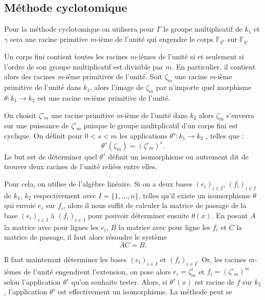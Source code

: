 \documentclass[a4paper]{article} %
\numberwithin{section}{part}
\numberwithin{equation}{section}
\newcommand\nroot[1]{\textit{#1}-ième}
\newcommand\GF[1]{\mathbb{F}_{#1}}
\begin{document}
\subsection{Méthode cyclotomique}
Pour la méthode cyclotomique on utilisera pour $\Gamma$ le groupe multiplicatif 
de $k_1$ et $\gamma$ sera une racine primitive \nroot{m} de l'unité qui engendre
le corps $\GF{q^n}$ sur $\GF{q}$.\par
Un corps fini contient toutes les racines $m$-ièmes de l'unité si et seulement 
si l'ordre de son groupe multiplicatif est divisible par $m$. En particulier, il
contient alors des racines \nroot{m} primitives de l'unité. Soit $\zeta_m$ une
racine \nroot{m} primitive de l'unité dans $k_1$, alors l'image de $\zeta_m$ par
n'importe quel morphisme $\theta : k_1 \to k_2$ est une racine \nroot{m} 
primitive de l'unité.\par
On choisit $\zeta'_m$ une racine primitive \nroot{m} de l'unité dans $k_2$
alors $\zeta_m$ s'enverra sur une puissance de $\zeta'_m$ puisque le groupe 
mulitplicatif d'un corps fini est cyclique. On définit pour $0 < s < m$ les
applications $\theta^s : k_1 \to k_2$ , telles que :
\begin{equation}
\theta^s(\zeta_m) = (\zeta'_m)^s.
\end{equation}
Le but est de déterminer quel $\theta^s$ définit un isomorphisme ou autrement
dit de trouver deux racines de l'unité reliées entre elles.\par
Pour cela, on utilise de l'algèbre linéaire. Si on a deux bases 
$(e_i)_{i\in I}$, $(f_i)_{i\in I}$ de $k_1$, $k_2$ respectivement avec $I =
\lbrace{1,\dots,n}\rbrace$, telles qu'il existe un isomorphisme $\theta$ qui 
envoie $e_i$ sur $f_i$, alors il nous suffit de calculer la matrice de passage 
de la base $(e_i)_{i\in I}$ à $(f_i)_{i\in I}$ pour pouvoir déterminer ensuite 
$\theta(x)$. En posant $A$ la matrice avec pour lignes les $e_i$, $B$ la matrice
avec pour ligne les $f_i$ et $C$ la matrice de passage, il faut alors résoudre 
le système 
\begin{equation}
AC = B.
\end{equation}
\par
Il faut maintenant déterminer les bases $(e_i)_{i\in I}$ et $(f_i)_{i\in I}$. 
Or, les racines $m$-ièmes de l'unité engendrent l'extension, on pose alors 
$e_i = \zeta_m^i$ et $f_i = (\zeta'_m)^{si}$ selon l'application $\theta^s$ 
qu'on souhaite tester. Alors, si $\theta^s(x)$ est racine de $f$ sur $k_2$, 
l'application $\theta^s$ est effectivement un isomorphisme. La méthode peut se 
\end{document}
